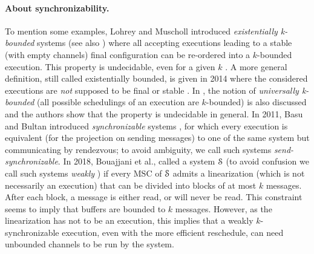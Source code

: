 \documentclass[a4paper,UKenglish,cleveref, autoref, thm-restate]{lipics-v2021}
\begin{document}
\paragraph*{About synchronizability.}
To mention some examples, Lohrey and Mus\-choll introduced
\emph{existentially k-bounded} systems \cite{DBLP:journals/iandc/LohreyM04} (see
also \cite{DBLP:conf/fossacs/LohreyM02,DBLP:conf/dlt/GenestMK04,GKM07}) where
all accepting executions leading to a stable (with empty channels) final
configuration can be re-ordered into a $k$-bounded execution. This property is
undecidable, even for a given $k$ \cite{GKM07}. A  more general definition,
still called existentially bounded, is given in 2014 where the considered
executions are \emph{not} supposed to be final or stable
\cite{kuske2014communicating}. In  \cite{DBLP:journals/iandc/LohreyM04,HENRIKSEN20051}, the notion of
\emph{universally k-bounded} (all possible schedulings of an execution are $k$-bounded) is also
discussed and the authors show that the property is undecidable in
general.
%
In 2011, Basu and Bultan introduced \emph{synchronizable} systems \cite{DBLP:conf/www/BasuB11}, for which every execution is equivalent (for the projection on sending messages)
to one of the same system but communicating by rendezvous; to avoid ambiguity, we call such systems \emph{send-synchronizable}.
%
In 2018, Bouajjani et al., called a system $\mathcal{S}$ \emph{} \cite{DBLP:conf/cav/BouajjaniEJQ18} (to avoid confusion %
we call such systems \emph{weakly }) if every MSC of $\mathcal{S}$
admits a linearization (which is not necessarily an execution) that can be divided into blocks of at most $k$ messages. After each block, a message is either read, or will never be read.
This constraint
seems to imply that buffers are bounded to $k$ messages.
 However,
as the linearization has not to be an execution, this implies that a weakly $k$-synchronizable execution, even with the more efficient reschedule, can need unbounded channels to be run by the system.
\end{document}
